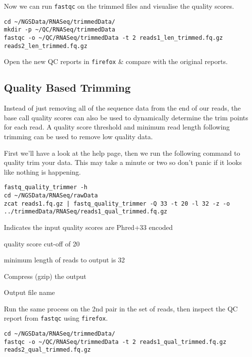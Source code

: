 \begin{steps}
Now we can run \texttt{fastqc} on the trimmed files and visualise the quality scores.
\begin{lstlisting}
cd ~/NGSData/RNASeq/trimmedData/
mkdir -p ~/QC/RNASeq/trimmedData
fastqc -o ~/QC/RNASeq/trimmedData -t 2 reads1_len_trimmed.fq.gz reads2_len_trimmed.fq.gz
\end{lstlisting}
Open the new QC reports in \texttt{firefox} \& compare with the original reports.
\end{steps}


\subsection{Quality Based Trimming}
Instead of just removing all of the sequence data from the end of our reads, the base call quality scores can also be used to dynamically determine the trim points for each read. 
A quality score threshold and minimum read length following trimming can be used to remove low quality data. \\
\begin{steps}
First we'll have a look at the help page, then we  run the following command to quality trim your data.
This may take a minute or two so don't panic if it looks like nothing is happening.
\begin{lstlisting}
fastq_quality_trimmer -h
cd ~/NGSData/RNASeq/rawData
zcat reads1.fq.gz | fastq_quality_trimmer -Q 33 -t 20 -l 32 -z -o ../trimmedData/RNASeq/reads1_qual_trimmed.fq.gz
\end{lstlisting}
\end{steps}

\begin{note}
\begin{description}[style=multiline,labelindent=0cm,align=right,leftmargin=0.8\descriptionlabelspace,rightmargin=1.5cm,font=\ttfamily]
\item[-Q 33] Indicates the input quality scores are Phred+33 encoded
\item[-t 20] quality score cut-off of 20
\item[-l 32] minimum length of reads to output is 32
\item[-z] Compress (gzip) the output
\item[-o] Output file name
\end{description}
\end{note}

\begin{steps}
Run the same process on the 2nd pair in the set of reads, then inspect the QC report from \texttt{fastqc} using \texttt{firefox}.
\begin{lstlisting}
cd ~/NGSData/RNASeq/trimmedData/
fastqc -o ~/QC/RNASeq/trimmedData -t 2 reads1_qual_trimmed.fq.gz reads2_qual_trimmed.fq.gz
\end{lstlisting}
\end{steps}

